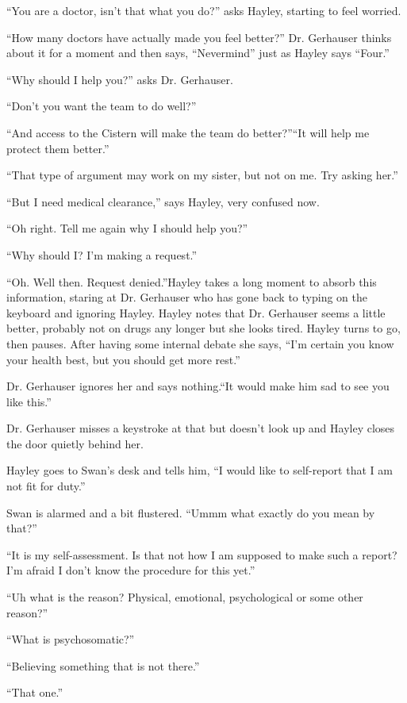 ``You are a doctor, isn't that what you do?'' asks Hayley, starting to feel worried.

``How many doctors have actually made you feel better?''  Dr. Gerhauser thinks about it for a moment and then says, ``Nevermind'' just as Hayley says ``Four.''

``Why should I help you?'' asks Dr. Gerhauser.

``Don't you want the team to do well?''

``And access to the Cistern will make the team do better?''``It will help me protect them better.''

``That type of argument may work on my sister, but not on me.  Try asking her.''

``But I need medical clearance,'' says Hayley, very confused now.

``Oh right.  Tell me again why I should help you?''

``Why should I?  I'm making a request.''

``Oh.  Well then.  Request denied.''Hayley takes a long moment to absorb this information, staring at Dr. Gerhauser who has gone back to typing on the keyboard and ignoring Hayley.  Hayley notes that Dr. Gerhauser seems a little better, probably not on drugs any longer but she looks tired.  Hayley turns to go, then pauses.  After having some internal debate she says, ``I'm certain you know your health best, but you should get more rest.''

Dr. Gerhauser ignores her and says nothing.``It would make him sad to see you like this.''

Dr. Gerhauser misses a keystroke at that but doesn't look up and Hayley closes the door quietly behind her.



Hayley goes to Swan's desk and tells him, ``I would like to self-report that I am not fit for duty.''

Swan is alarmed and a bit flustered.  ``Ummm what exactly do you mean by that?''

``It is my self-assessment.  Is that not how I am supposed to make such a report?  I'm afraid I don't know the procedure for this yet.''

``Uh what is the reason?  Physical, emotional, psychological or some other reason?''

``What is psychosomatic?''

``Believing something that is not there.''

``That one.''

